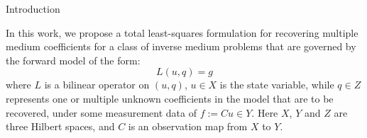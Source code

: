\documentclass[11pt]{article}%
\renewcommand{\_}{{\fontfamily{ptm}\selectfont\textunderscore}}
\theoremstyle{plain}
\numberwithin{equation}{section}
\begin{document}
\begin{section}{Introduction}\label{intro}

In this work, we propose a total least-squares formulation for recovering multiple medium coefficients for a class of inverse medium problems that are governed by the forward model of the form: 
\begin{equation}
L(u,q)=g\label{gov}
\end{equation}
where $L$ is a bilinear operator on $(u, q)$,
 $u\in X$ is the state variable, while $q\in Z$ represents one or multiple unknown coefficients in the model 
that are to be recovered, under some measurement data of $f:=Cu\in Y$. Here $X$, $Y$ and $Z$ are three Hilbert spaces, 
and $C$ is an observation map from $X$ to $Y$. 



\end{section}
\end{document}
